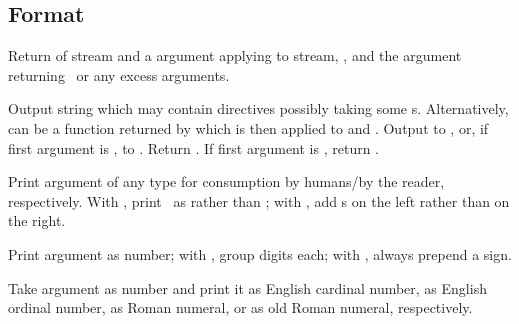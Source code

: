 \subsection{Format}
\label{section:Format}

\begin{LIST}{1cm}

  {
  Return  of stream and a  argument applying  to
  stream, , and the  argument
  returning \NIL\ or any excess arguments. 
  }

  {
  Output string  which may
  contain \kwd{\TLD} directives possibly taking some
  s. Alternatively,  can be a function returned
  by  which is then applied to  and .
  Output to ,  or, if first
  argument is \T, to . Return \retval{\NIL}. If
  first argument is \NIL, return . 
  }

  \begin{LIST}{.5cm}

    {
    Print argument of any type for consumption by humans/by the
    reader, respectively. With \kwd{:}, print \NIL\ as \LIT{()} rather
    than ; with , add s on the left
    rather than on the right.
  }

    {
    Print argument as number; with \KWD{:}, group digits 
     each; with , always prepend a sign.
  }

    {
    Take argument as number and print it as English cardinal number,
    as English ordinal number, as Roman numeral, or as old Roman
    numeral, respectively.
  }


\end{LIST}
\end{LIST}
